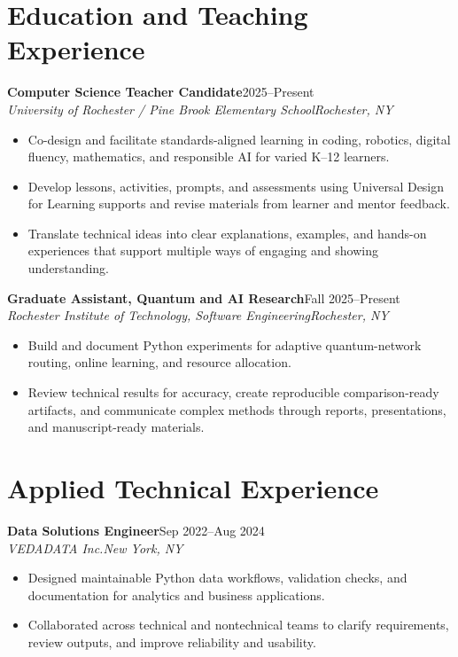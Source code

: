 \documentclass[10pt,letterpaper]{article}
\newcommand{\role}[4]{%
  \textbf{#1}\hfill #2\\
  \textit{#3}\hfill \textit{#4}\vspace{-3pt}
}
\begin{document}
\section*{Education and Teaching Experience}
\role{Computer Science Teacher Candidate}{2025--Present}
{University of Rochester / Pine Brook Elementary School}{Rochester, NY}
\begin{itemize}
  \item Co-design and facilitate standards-aligned learning in coding, robotics,
    digital fluency, mathematics, and responsible AI for varied K--12 learners.
  \item Develop lessons, activities, prompts, and assessments using Universal
    Design for Learning supports and revise materials from learner and mentor
    feedback.
  \item Translate technical ideas into clear explanations, examples, and
    hands-on experiences that support multiple ways of engaging and showing
    understanding.
\end{itemize}

\role{Graduate Assistant, Quantum and AI Research}{Fall 2025--Present}
{Rochester Institute of Technology, Software Engineering}{Rochester, NY}
\begin{itemize}
  \item Build and document Python experiments for adaptive quantum-network
    routing, online learning, and resource allocation.
  \item Review technical results for accuracy, create reproducible
    comparison-ready artifacts, and communicate complex methods through
    reports, presentations, and manuscript-ready materials.
\end{itemize}

\section*{Applied Technical Experience}
\role{Data Solutions Engineer}{Sep 2022--Aug 2024}
{VEDADATA Inc.}{New York, NY}
\begin{itemize}
  \item Designed maintainable Python data workflows, validation checks, and
    documentation for analytics and business applications.
  \item Collaborated across technical and nontechnical teams to clarify
    requirements, review outputs, and improve reliability and usability.
\end{itemize}
\end{document}
